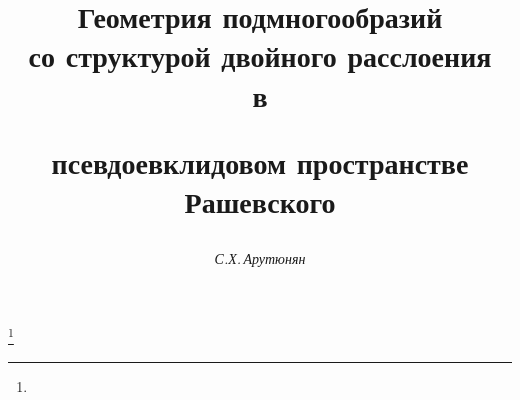 




%





\newcommand{\tts}[1]{}










\setcounter{page}{3}















\author{\it С.Х.\,Арутюнян}




\title{Геометрия подмногообразий\\ со структурой двойного расслоения\\ в


псевдоевклидовом пространстве Рашевского}


\thanks{}





\date{}




\pagestyle{plain} %







\maketitle


